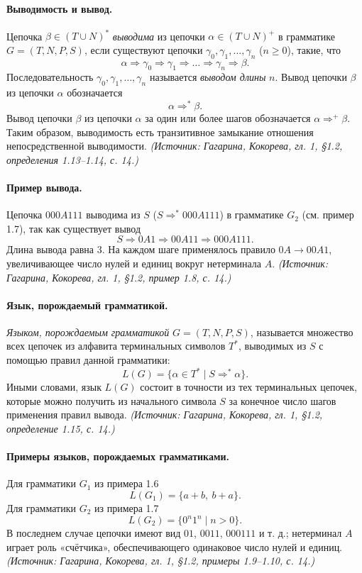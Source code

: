\documentclass[a4paper,12pt]{article}
\begin{document}
\paragraph{Выводимость и вывод.}
Цепочка \(\beta\in(T\cup N)^*\) \emph{выводима} из цепочки \(\alpha\in(T\cup N)^+\) в грамматике \(G=(T,N,P,S)\), если существуют цепочки \(\gamma_0,\gamma_1,\ldots,\gamma_n\) (\(n\ge0\)), такие, что
\[
\alpha\Rightarrow\gamma_0\Rightarrow\gamma_1\Rightarrow\ldots\Rightarrow\gamma_n\Rightarrow\beta.
\]
Последовательность \(\gamma_0,\gamma_1,\ldots,\gamma_n\) называется \emph{выводом длины} \(n\). Вывод цепочки \(\beta\) из цепочки \(\alpha\) обозначается
\[
\alpha\Rightarrow^*\beta.
\]
Вывод цепочки \(\beta\) из цепочки \(\alpha\) за один или более шагов обозначается \(\alpha\Rightarrow^+\beta\). Таким образом, выводимость есть транзитивное замыкание отношения непосредственной выводимости.
\textit{(Источник: Гагарина, Кокорева, гл. 1, §1.2, определения 1.13--1.14, с. 14.)}

\paragraph{Пример вывода.}
Цепочка \(000A111\) выводима из \(S\) (\(S\Rightarrow^*000A111\)) в грамматике \(G_2\) (см. пример 1.7), так как существует вывод
\[
S\Rightarrow0A1\Rightarrow00A11\Rightarrow000A111.
\]
Длина вывода равна 3. На каждом шаге применялось правило \(0A\to00A1\), увеличивающее число нулей и единиц вокруг нетерминала \(A\).
\textit{(Источник: Гагарина, Кокорева, гл. 1, §1.2, пример 1.8, с. 14.)}

\paragraph{Язык, порождаемый грамматикой.}
\emph{Языком, порождаемым грамматикой} \(G=(T,N,P,S)\), называется множество всех цепочек из алфавита терминальных символов \(T^*\), выводимых из \(S\) с помощью правил данной грамматики:
\[
L(G)=\{\alpha\in T^*\mid S\Rightarrow^*\alpha\}.
\]
Иными словами, язык \(L(G)\) состоит в точности из тех терминальных цепочек, которые можно получить из начального символа \(S\) за конечное число шагов применения правил вывода.
\textit{(Источник: Гагарина, Кокорева, гл. 1, §1.2, определение 1.15, с. 14.)}

\paragraph{Примеры языков, порождаемых грамматиками.}
Для грамматики \(G_1\) из примера 1.6
\[
L(G_1)=\{a+b,\ b+a\}.
\]
Для грамматики \(G_2\) из примера 1.7
\[
L(G_2)=\{0^n1^n\mid n>0\}.
\]
В последнем случае цепочки имеют вид \(01\), \(0011\), \(000111\) и т. д.; нетерминал \(A\) играет роль «счётчика», обеспечивающего одинаковое число нулей и единиц.
\textit{(Источник: Гагарина, Кокорева, гл. 1, §1.2, примеры 1.9--1.10, с. 14.)}
\end{document}
